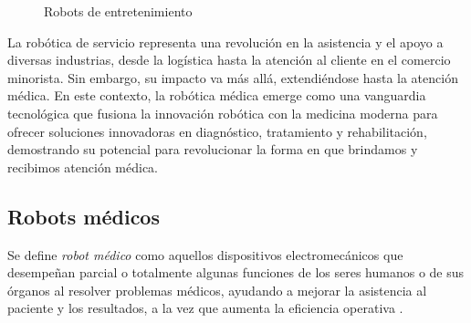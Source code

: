 \begin{itemize}
  \begin{figure}[H]
    \begin{center}
      \subcapcentertrue
      \hspace{2mm}
    \end{center}
    \caption{Robots de entretenimiento}
    \label{fig:Robots_entretenimiento}
  \end{figure}
   
\end{itemize}

La robótica de servicio representa una revolución en la asistencia y el apoyo a diversas industrias, desde la logística hasta la atención al cliente en el comercio minorista. Sin embargo, su impacto va más allá, extendiéndose hasta la atención médica. En este contexto, la robótica médica emerge como una vanguardia tecnológica que fusiona la innovación robótica con la medicina moderna para ofrecer soluciones innovadoras en diagnóstico, tratamiento y rehabilitación, demostrando su potencial para revolucionar la forma en que brindamos y recibimos atención médica.
 
\subsection{Robots médicos}
\label{sec:robotica_industrial} 

Se define \textit{robot médico} como aquellos dispositivos electromecánicos que desempeñan parcial o totalmente algunas funciones de los seres humanos o de sus órganos al resolver problemas médicos, ayudando a mejorar la asistencia al paciente y los resultados, a la vez que aumenta la eficiencia operativa \cite{Kraevsky10}.\\

